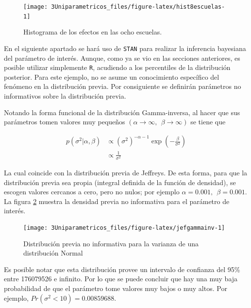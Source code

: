 \documentclass[
  10pt,
  spanish,
]{book}
\theoremstyle{definition}
\theoremstyle{definition}
\theoremstyle{definition}
\theoremstyle{definition}
\theoremstyle{remark}
\begin{document}
\begin{figure}

{\centering \texttt{[image: 3Uniparametricos\_files/figure-latex/hist8escuelas-1]} 

}

\caption{Histograma de los efectos en las ocho escuelas.}\label{fig:hist8escuelas}
\end{figure}

En el siguiente apartado se hará uso de \texttt{STAN} para realizar la inferencia bayesiana del parámetro de interés. Aunque, como ya se vio en las secciones anteriores, es posible utilizar simplemente \texttt{R}, acudiendo a los percentiles de la distribución posterior. Para este ejemplo, no se asume un conocimiento específico del fenómeno en la distribución previa. Por consiguiente se definirán parámetros no informativos sobre la distribución previa.

Notando la forma funcional de la distribución Gamma-inversa, al hacer que sus parámetros tomen valores muy pequeños \((\alpha \rightarrow \infty, \ \ \beta \rightarrow \infty)\) se tiene que

\begin{align*}
p(\sigma^2|\alpha,\beta) 
&\propto (\sigma^2)^{-\alpha-1}
\exp(-\frac{\beta}{\sigma^2}) \\
&\propto \frac{1}{\sigma^2}
\end{align*}

La cual coincide con la distribución previa de Jeffreys. De esta forma, para que la distribución previa sea propia (integral definida de la función de densidad), se escogen valores cercanos a cero, pero no nulos; por ejemplo \(\alpha = 0.001, \ \ \beta = 0.001\). La figura \ref{fig:jefgammainv} muestra la densidad previa no informativa para el parámetro de interés.

\begin{figure}

{\centering \texttt{[image: 3Uniparametricos\_files/figure-latex/jefgammainv-1]} 

}

\caption{Distribución previa no informativa para la varianza de una distribución Normal}\label{fig:jefgammainv}
\end{figure}

Es posible notar que esta distribución provee un intervalo de confianza del 95\% entre 176079526 e infinito. Por lo que se puede concluir que hay una muy baja probabilidad de que el parámetro tome valores muy bajos o muy altos. Por ejemplo, \(Pr(\sigma^2 < 10) = 0.00859688\).
\end{document}

